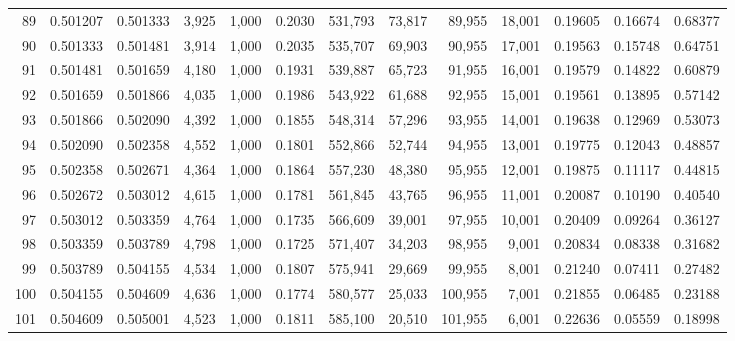 \begin{tabular}{rrrrrrrrrrrrr}
89  &  0.501207 &  0.501333 &  3,925 &  1,000 &                                     0.2030 &  531,793 &   73,817 &   89,955 &   18,001 &  0.19605 &  0.16674 &  0.68377 \\
90  &  0.501333 &  0.501481 &  3,914 &  1,000 &                                     0.2035 &  535,707 &   69,903 &   90,955 &   17,001 &  0.19563 &  0.15748 &  0.64751 \\
91  &  0.501481 &  0.501659 &  4,180 &  1,000 &                                     0.1931 &  539,887 &   65,723 &   91,955 &   16,001 &  0.19579 &  0.14822 &  0.60879 \\
92  &  0.501659 &  0.501866 &  4,035 &  1,000 &                                     0.1986 &  543,922 &   61,688 &   92,955 &   15,001 &  0.19561 &  0.13895 &  0.57142 \\
93  &  0.501866 &  0.502090 &  4,392 &  1,000 &                                     0.1855 &  548,314 &   57,296 &   93,955 &   14,001 &  0.19638 &  0.12969 &  0.53073 \\
94  &  0.502090 &  0.502358 &  4,552 &  1,000 &                                     0.1801 &  552,866 &   52,744 &   94,955 &   13,001 &  0.19775 &  0.12043 &  0.48857 \\
95  &  0.502358 &  0.502671 &  4,364 &  1,000 &                                     0.1864 &  557,230 &   48,380 &   95,955 &   12,001 &  0.19875 &  0.11117 &  0.44815 \\
96  &  0.502672 &  0.503012 &  4,615 &  1,000 &                                     0.1781 &  561,845 &   43,765 &   96,955 &   11,001 &  0.20087 &  0.10190 &  0.40540 \\
97  &  0.503012 &  0.503359 &  4,764 &  1,000 &                                     0.1735 &  566,609 &   39,001 &   97,955 &   10,001 &  0.20409 &  0.09264 &  0.36127 \\
98  &  0.503359 &  0.503789 &  4,798 &  1,000 &                                     0.1725 &  571,407 &   34,203 &   98,955 &    9,001 &  0.20834 &  0.08338 &  0.31682 \\
99  &  0.503789 &  0.504155 &  4,534 &  1,000 &                                     0.1807 &  575,941 &   29,669 &   99,955 &    8,001 &  0.21240 &  0.07411 &  0.27482 \\
100 &  0.504155 &  0.504609 &  4,636 &  1,000 &                                     0.1774 &  580,577 &   25,033 &  100,955 &    7,001 &  0.21855 &  0.06485 &  0.23188 \\
101 &  0.504609 &  0.505001 &  4,523 &  1,000 &                                     0.1811 &  585,100 &   20,510 &  101,955 &    6,001 &  0.22636 &  0.05559 &  0.18998 \\

\end{tabular}
